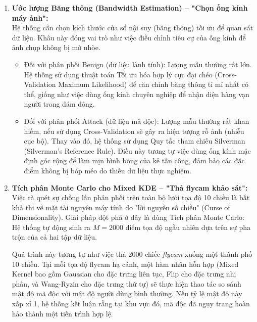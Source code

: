 \documentclass[../main.tex]{subfiles}
\begin{document}
\begin{enumerate}
    \item \textbf{Ước lượng Băng thông (Bandwidth Estimation) -- "Chọn ống kính máy ảnh":} \\
    Hệ thống cần chọn kích thước cửa sổ nội suy (băng thông) tối ưu để quan sát dữ liệu. Khâu này đóng vai trò như việc điều chỉnh tiêu cự của ống kính để ảnh chụp không bị mờ nhòe.
    \begin{itemize}
        \item Đối với phân phối Benign (dữ liệu lành tính): Lượng mẫu thường rất lớn. Hệ thống sử dụng thuật toán Tối ưu hóa hợp lý cực đại chéo (Cross-Validation Maximum Likelihood) để căn chỉnh băng thông tỉ mỉ nhất có thể, giống như việc dùng ống kính chuyên nghiệp để nhận diện hàng vạn người trong đám đông.
        \item Đối với phân phối Attack (dữ liệu mã độc): Lượng mẫu thường rất khan hiếm, nếu sử dụng Cross-Validation sẽ gây ra hiện tượng rỗ ảnh (nhiễu cục bộ). Thay vào đó, hệ thống sử dụng Quy tắc tham chiếu Silverman (Silverman's Reference Rule). Điều này tương tự việc dùng ống kính mặc định góc rộng để làm mịn hình bóng của kẻ tấn công, đảm bảo các đặc điểm không bị bóp méo do thiếu dữ liệu thực nghiệm.
    \end{itemize}
    \item \textbf{Tích phân Monte Carlo cho Mixed KDE -- "Thả flycam khảo sát":} \\
    Việc rà quét sự chồng lấn phân phối trên toàn bộ lưới tọa độ 10 chiều là bất khả thi về mặt tài nguyên máy tính do "lời nguyền số chiều" (Curse of Dimensionality). Giải pháp đột phá ở đây là dùng Tích phân Monte Carlo: Hệ thống tự động sinh ra $M = 2000$ điểm tọa độ ngẫu nhiên dựa trên sự pha trộn của cả hai tập dữ liệu. 
    
    Quá trình này tương tự như việc thả 2000 chiếc \textit{flycam} xuống một thành phố 10 chiều. Tại mỗi tọa độ flycam hạ cánh, một hàm nhân hỗn hợp (Mixed Kernel bao gồm Gaussian cho đặc trưng liên tục, Flip cho đặc trưng nhị phân, và Wang-Ryzin cho đặc trưng thứ tự) sẽ thực hiện thao tác so sánh mật độ mã độc với mật độ người dùng bình thường. Nếu tỷ lệ mật độ này xấp xỉ 1, hệ thống kết luận rằng tại khu vực đó, mã độc đã ngụy trang hoàn hảo thành một tiến trình hợp lệ.
\end{enumerate}
\end{document}
